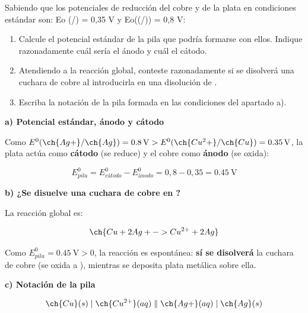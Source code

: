 \begin{exerciseEVAU}
    Sabiendo que los potenciales de reducción del cobre y de la plata en condiciones estándar son:
    Eo (/) = 0,35 V y Eo((/)) = 0,8 V:
    \begin{enumerate}[label=\letraminuscula]
        \item Calcule el potencial estándar de la pila que podría formarse con ellos.
        Indique razonadamente
        cuál sería el ánodo y cuál el cátodo.
        \item Atendiendo a la reacción global, conteste razonadamente si se disolverá una cuchara de
        cobre al introducirla en una disolución de .
        \item Escriba la notación de la pila formada en las condiciones del apartado a).
    \end{enumerate}
    \begin{solu}

        \textbf{a) Potencial estándar, ánodo y cátodo}

        Como \(E^0(\ch{Ag+}/\ch{Ag}) = \SI{0.8}{\volt} > E^0(\ch{Cu^2+}/\ch{Cu}) = \SI{0.35}{\volt}\), la plata actúa como \textbf{cátodo} (se reduce) y el cobre como \textbf{ánodo} (se oxida):

        \begin{equation*}
            E^0_{pila} = E^0_{cátodo} - E^0_{ánodo} = 0,8-0,35 = \SI{0.45}{\volt}
        \end{equation*}

        \textbf{b) ¿Se disuelve una cuchara de cobre en ?}

        La reacción global es:

        \begin{equation*}
            \ch{Cu + 2 Ag+ -> Cu^{2+} + 2 Ag}
        \end{equation*}

        Como \(E^0_{pila} = \SI{0.45}{\volt} > 0\), la reacción es espontánea: \textbf{sí se disolverá} la cuchara de cobre (se oxida a ), mientras se deposita plata metálica sobre ella.

        \textbf{c) Notación de la pila}

        \begin{equation*}
            \ch{Cu}(s) \mid \ch{Cu^{2+}}(aq) \parallel \ch{Ag+}(aq) \mid \ch{Ag}(s)
        \end{equation*}

    \end{solu}
\end{exerciseEVAU}

